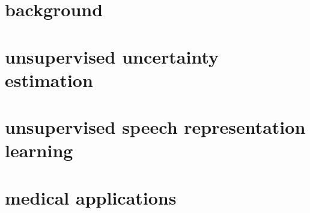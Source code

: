 \documentclass[\classfontsize,\papersize,twoside,showtrims,extrafontsizes]{memoir}
\begin{document}
\prefrontmatter

\cleartoevenpage

\cleartooddpage

\cleartoevenpage

\frontmatter





% 




\clearforchapter
\tableofcontents*

\clearforchapter
\mylistoftodos

\mainmatter

\part[background]{background}\label{part:background}





\part[unsupervised uncertainty estimation]{unsupervised uncertainty estimation}\label{part:unsupervised-uncertainty-estimation}



\part[unsupervised speech representation learning]{unsupervised speech representation learning}\label{part:unsupervised-speech-representation-learning}


\part[medical applications]{medical applications}\label{part:medical-applications}


\end{document}
